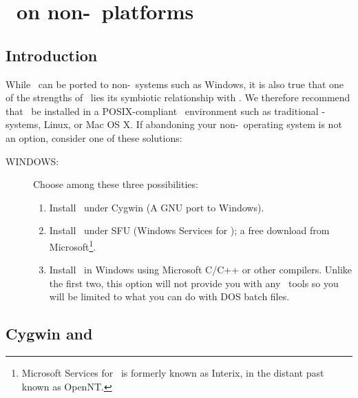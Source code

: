 %
%
\chapter{\gmt\ on non-\UNIX\ platforms}
\label{app:L}

\section{Introduction}

While \GMT\ can be ported to non-\UNIX\ systems such as
Windows, it is also true that one of the
strengths of \GMT\ lies its symbiotic relationship with
\UNIX.  We therefore recommend that \GMT\ be installed in
a POSIX-compliant \UNIX\ environment such as traditional \UNIX-systems, Linux,
or Mac OS X.  If abandoning your non-\UNIX\ operating system
is not an option, consider one of these solutions:

\begin{description}
\item [WINDOWS:] Choose among these three possibilities:

\begin{enumerate}

\item Install \GMT\ under Cygwin (A GNU port to Windows). 

\item Install \GMT\ under SFU (Windows Services for \UNIX); a free download from
Microsoft\footnote{Microsoft Services for \UNIX\ is formerly known as Interix, in the distant past known as OpenNT.}.

\item Install \GMT\ in Windows using Microsoft C/C++ or other
compilers.  Unlike the first two, this option will not provide you with any
\UNIX\ tools so you will be limited to what you can do with
DOS batch files.


\end{enumerate}

\end{description}

\section{Cygwin and \gmt}

